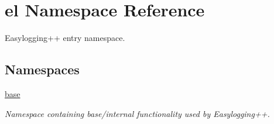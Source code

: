 \hypertarget{namespaceel}{\section{el Namespace Reference}
\label{namespaceel}
}


Easylogging++ entry namespace.  


\subsection*{Namespaces}
\begin{DoxyCompactItemize}
\item 
\hyperlink{namespaceel_1_1base}{base}
\begin{DoxyCompactList}\small\item\em Namespace containing base/internal functionality used by Easylogging++. \end{DoxyCompactList}\end{DoxyCompactItemize}
